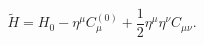\begin{equation}
 \tilde{H}=H_0-\eta^\mu C_\mu ^{(0)}+ \frac{1}{2}\eta^\mu \eta^\nu C_{\mu\nu}.
 \label{a33}
 \end{equation}

